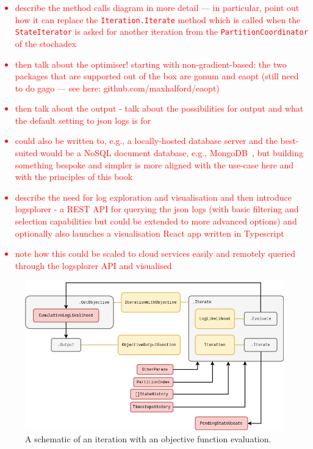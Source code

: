 \textcolor{red}{\begin{itemize}
\item{describe the method calls diagram in more detail --- in particular, point out how it can replace the \texttt{Iteration.Iterate} method which is called when the \texttt{StateIterator} is asked for another iteration from the \texttt{PartitionCoordinator} of the stochadex}
\item{then talk about the optimiser! starting with non-gradient-based: the two packages that are supported out of the box are gonum and eaopt (still need to do gago --- see here: github.com/maxhalford/eaopt) }
\item{then talk about the output - talk about the possibilities for output and what the default setting to json logs is for}
\item{could also be written to, e.g., a locally-hosted database server and the best-suited would be a NoSQL document database, e.g., MongoDB~\cite{mongodb}, but building something bespoke and simpler is more aligned with the use-case here and with the principles of this book}
\item{describe the need for log exploration and visualisation and then introduce logsplorer - a REST API for querying the json logs (with basic filtering and selection capabilities but could be extended to more advanced options) and optionally also launches a visualisation React app written in Typescript}
\item{note how this could be scaled to cloud services easily and remotely queried through the logsplorer API and visualised} 
\end{itemize}}

\begin{figure}[h]
\centering
\includegraphics[width=14cm]{images/chapter-4-learnadex-data-iterator.drawio.png}
\caption{A schematic of an iteration with an objective function evaluation.}
\label{fig:learnadex-data-iterator}
\end{figure}


